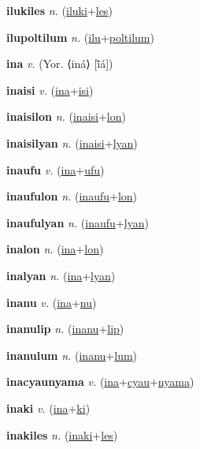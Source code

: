 \textbf{\hypertarget{ilukiles}{ilukiles}} \textit{n.} (\hyperlink{iluki}{iluki}+\allowbreak \hyperlink{les}{les})


\textbf{\hypertarget{ilupoltilum}{ilupoltilum}} \textit{n.} (\hyperlink{ilu}{ilu}+\allowbreak \hyperlink{poltilum}{poltilum})


\textbf{\hypertarget{ina}{ina}} \textit{v.} (Yor. ⟨iná⟩ [ĩ̄á])


\textbf{\hypertarget{inaisi}{inaisi}} \textit{v.} (\hyperlink{ina}{ina}+\allowbreak \hyperlink{isi}{isi})


\textbf{\hypertarget{inaisilon}{inaisilon}} \textit{n.} (\hyperlink{inaisi}{inaisi}+\allowbreak \hyperlink{lon}{lon})


\textbf{\hypertarget{inaisilyan}{inaisilyan}} \textit{n.} (\hyperlink{inaisi}{inaisi}+\allowbreak \hyperlink{lyan}{lyan})


\textbf{\hypertarget{inaufu}{inaufu}} \textit{v.} (\hyperlink{ina}{ina}+\allowbreak \hyperlink{ufu}{ufu})


\textbf{\hypertarget{inaufulon}{inaufulon}} \textit{n.} (\hyperlink{inaufu}{inaufu}+\allowbreak \hyperlink{lon}{lon})


\textbf{\hypertarget{inaufulyan}{inaufulyan}} \textit{n.} (\hyperlink{inaufu}{inaufu}+\allowbreak \hyperlink{lyan}{lyan})


\textbf{\hypertarget{inalon}{inalon}} \textit{n.} (\hyperlink{ina}{ina}+\allowbreak \hyperlink{lon}{lon})


\textbf{\hypertarget{inalyan}{inalyan}} \textit{n.} (\hyperlink{ina}{ina}+\allowbreak \hyperlink{lyan}{lyan})


\textbf{\hypertarget{inanu}{inanu}} \textit{v.} (\hyperlink{ina}{ina}+\allowbreak \hyperlink{nu}{nu})


\textbf{\hypertarget{inanulip}{inanulip}} \textit{n.} (\hyperlink{inanu}{inanu}+\allowbreak \hyperlink{lip}{lip})


\textbf{\hypertarget{inanulum}{inanulum}} \textit{n.} (\hyperlink{inanu}{inanu}+\allowbreak \hyperlink{lum}{lum})


\textbf{\hypertarget{inacyaunyama}{inacyaunyama}} \textit{v.} (\hyperlink{ina}{ina}+\allowbreak \hyperlink{cyau}{cyau}+\allowbreak \hyperlink{nyama}{nyama})


\textbf{\hypertarget{inaki}{inaki}} \textit{v.} (\hyperlink{ina}{ina}+\allowbreak \hyperlink{ki}{ki})


\textbf{\hypertarget{inakiles}{inakiles}} \textit{n.} (\hyperlink{inaki}{inaki}+\allowbreak \hyperlink{les}{les})


